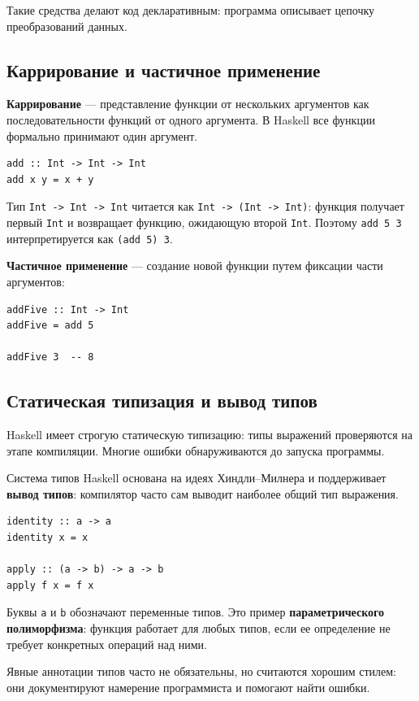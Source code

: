 Такие средства делают код декларативным: программа описывает цепочку преобразований данных.

\subsection*{Каррирование и частичное применение}

\textbf{Каррирование} --- представление функции от нескольких аргументов как последовательности функций от одного аргумента. В Haskell все функции формально принимают один аргумент.

\begin{verbatim}
add :: Int -> Int -> Int
add x y = x + y
\end{verbatim}

Тип \texttt{Int -> Int -> Int} читается как \texttt{Int -> (Int -> Int)}: функция получает первый \texttt{Int} и возвращает функцию, ожидающую второй \texttt{Int}. Поэтому \texttt{add 5 3} интерпретируется как \texttt{(add 5) 3}.

\textbf{Частичное применение} --- создание новой функции путем фиксации части аргументов:

\begin{verbatim}
addFive :: Int -> Int
addFive = add 5

addFive 3  -- 8
\end{verbatim}

\subsection*{Статическая типизация и вывод типов}

Haskell имеет строгую статическую типизацию: типы выражений проверяются на этапе компиляции. Многие ошибки обнаруживаются до запуска программы.

Система типов Haskell основана на идеях Хиндли--Милнера и поддерживает \textbf{вывод типов}: компилятор часто сам выводит наиболее общий тип выражения.

\begin{verbatim}
identity :: a -> a
identity x = x

apply :: (a -> b) -> a -> b
apply f x = f x
\end{verbatim}

Буквы \texttt{a} и \texttt{b} обозначают переменные типов. Это пример \textbf{параметрического полиморфизма}: функция работает для любых типов, если ее определение не требует конкретных операций над ними.

Явные аннотации типов часто не обязательны, но считаются хорошим стилем: они документируют намерение программиста и помогают найти ошибки.

